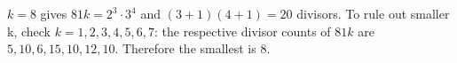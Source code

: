 $k=8$ gives $81k=2^3\cdot 3^4$ and $(3+1)(4+1)=20$ divisors. To rule out smaller k, check $k=1,2,3,4,5,6,7$: the respective divisor counts of $81k$ are $5,10,6,15,10,12,10$. Therefore the smallest is $\boxed 8$.
